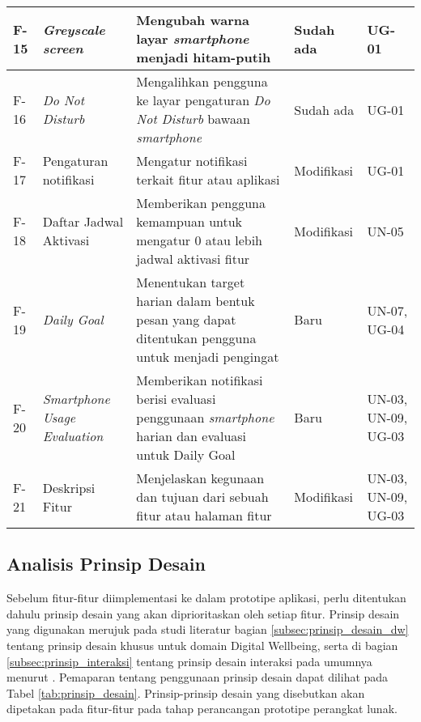 \begin{small}
\begin{longtable}[c]{|W{c}{0.06\textwidth}|>{\ccnormspacingcenter}m{0.15\textwidth}|>{\ccnormspacing}m{0.35\textwidth}|>{\ccnormspacingcenter}m{0.12\textwidth}|>{\ccnormspacingcenter}m{0.16\textwidth}|}
  F-15 & \textit{Greyscale screen} & Mengubah warna layar \textit{smartphone} menjadi hitam-putih & Sudah ada & UG-01 \\ \hline
  F-16 & \textit{Do Not Disturb} & Mengalihkan pengguna ke layar pengaturan \textit{Do Not Disturb} bawaan \textit{smartphone} & Sudah ada & UG-01 \\ \hline
  F-17 & Pengaturan notifikasi & Mengatur notifikasi terkait fitur atau aplikasi & Modifikasi & UG-01 \\ \hline
  F-18 & Daftar Jadwal Aktivasi & Memberikan pengguna kemampuan untuk mengatur 0 atau lebih jadwal aktivasi fitur & Modifikasi & UN-05 \\ \hline
  F-19 & \textit{Daily Goal} & Menentukan target harian dalam bentuk pesan yang dapat ditentukan pengguna untuk menjadi pengingat & Baru & UN-07, UG-04 \\ \hline
  F-20 & \textit{Smartphone Usage Evaluation} & Memberikan notifikasi berisi evaluasi penggunaan \textit{smartphone} harian dan evaluasi untuk Daily Goal & Baru & UN-03, UN-09, UG-03 \\ \hline
  F-21 & Deskripsi Fitur & Menjelaskan kegunaan dan tujuan dari sebuah fitur atau halaman fitur & Modifikasi & UN-03, UN-09, UG-03 \\ \hline

\end{longtable}
\end{small}
\justifying
\FloatBarrier

\subsection{Analisis Prinsip Desain}
Sebelum fitur-fitur diimplementasi ke dalam prototipe aplikasi, perlu ditentukan dahulu prinsip desain yang akan diprioritaskan oleh setiap fitur. Prinsip desain yang digunakan merujuk pada studi literatur bagian \ref{subsec:prinsip_desain_dw} tentang prinsip desain khusus untuk domain Digital Wellbeing, serta di bagian \ref{subsec:prinsip_interaksi} tentang prinsip desain interaksi pada umumnya menurut \textcite{PreeceRogersSharp15}. Pemaparan tentang penggunaan prinsip desain dapat dilihat pada Tabel \ref{tab:prinsip_desain}. Prinsip-prinsip desain yang disebutkan akan dipetakan pada fitur-fitur pada tahap perancangan prototipe perangkat lunak.

